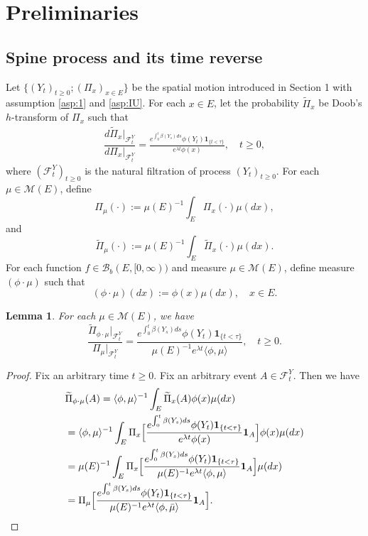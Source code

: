 \documentclass[12pt,a4paper]{amsart}
\numberwithin{equation}{section}
\theoremstyle{plain}
\newtheorem{lem}[thm]{Lemma}
\theoremstyle{definition}
\begin{document}
\section{Preliminaries}
\subsection{Spine process and its time reverse}
Let $\{(Y_t)_{t\geq 0}; (\Pi_x)_{x\in E}\}$ be the spatial motion introduced in Section 1 with assumption \ref{asp:1} and \ref{asp:IU}.
For each $x\in E$, let the probability $\widetilde \Pi_{x}$ be Doob's $h$-transform of $\Pi_x$ such that
\begin{align}
	\dfrac{d\widetilde{\Pi}_x|_{\mathscr F^Y_t}}{d\Pi_x|_{\mathscr F^Y_t}}= \frac{e^{\int_0^t \beta(Y_s)ds}\phi(Y_t) \mathbf 1_{\{t<\tau\}}}{e^{\lambda t}\phi(x)},
	\quad t\geq 0,
\end{align}
where $(\mathscr F_t^Y)_{t\geq 0}$ is the natural filtration of process $(Y_t)_{t\geq 0}$.
For each $\mu \in \mathcal M(E)$, define
\[
	\Pi_{\mu}(\cdot)
	:= \mu(E)^{-1}\int_{E} \Pi_x(\cdot)\mu(dx),
\]
and
\[
	\widetilde\Pi_{\mu}(\cdot):= \mu(E)^{-1} \int_E\widetilde\Pi_x(\cdot)\mu(dx).
\]
For each function $f \in \mathcal B_b(E,[0,\infty))$ and measure $\mu \in \mathcal M(E)$, define measure $(\phi \cdot\mu)$ such that
\[
  (\phi \cdot \mu)(dx)
  := \phi(x)\mu(dx),
  \quad x\in E.
\]
\begin{lem}
	For each $\mu\in \mathcal M(E)$, we have
 \[
    \dfrac{\widetilde \Pi_{\phi\cdot\mu}|_{\mathscr F_t^Y}}{\Pi_{\mu}|_{\mathscr F_t^Y}}
  	= \frac{e^{\int_0^t \beta(Y_s)ds}\phi(Y_t) \mathbf 1_{\{t<\tau\}}}{\mu(E)^{-1}e^{\lambda t}\langle \phi,\mu\rangle},
  	\quad t\geq 0.
  \]
\end{lem}
\begin{proof}
	Fix an arbitrary time $t\geq 0$. Fix an arbitrary event $A \in \mathscr
  F_t^Y$. Then we have
  \begin{align}
    &\widetilde{\Pi}_{\phi\cdot\mu}(A)
      = \langle\phi, \mu\rangle^{-1} \int_E \widetilde \Pi_x(A)\phi(x)\mu(dx)
    \\&=\langle\phi, \mu\rangle^{-1} \int_E  \Pi_x\Big[\frac{e^{\int_0^t \beta(Y_s)ds}\phi(Y_t) \mathbf 1_{\{t<\tau\}}}{e^{\lambda t}\phi(x)} \mathbf 1_A\Big]\phi(x)\mu(dx)
    \\&= \mu(E)^{-1}\int_E  \Pi_x\Big[\frac{e^{\int_0^t \beta(Y_s)ds}\phi(Y_t) \mathbf 1_{\{t<\tau\}}}{\mu(E)^{-1}e^{\lambda t}\langle \phi,\mu\rangle} \mathbf 1_A\Big]\mu(dx)
    \\&= \Pi_{\mu}\Big[\frac{e^{\int_0^t \beta(Y_s)ds}\phi(Y_t) \mathbf 1_{\{t<\tau\}}}{\mu(E)^{-1} e^{\lambda t}\langle \phi,\bar\mu\rangle} \mathbf 1_A\Big].
    \qedhere
  \end{align}
\end{proof}
\end{document}
